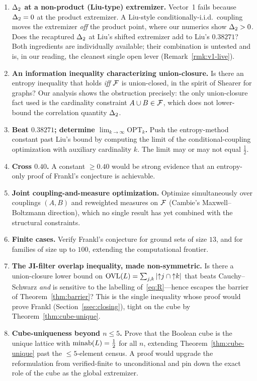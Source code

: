 \documentclass[11pt]{amsart}
\theoremstyle{definition}
\theoremstyle{remark}
\begin{document}
\begin{enumerate}[label=(Q\arabic*),leftmargin=2.6em]
\item \textbf{$\Delta_2$ at a non-product (Liu-type) extremizer.} Vector~1 fails
because $\Delta_2=0$ at the product extremizer. A Liu-style conditionally-i.i.d.\
coupling moves the extremizer \emph{off} the product point, where our numerics
show $\Delta_2>0$. Does the recaptured $\Delta_2$ at Liu's shifted extremizer add to
Liu's $0.38271$? Both ingredients are individually available; their combination is
untested and is, in our reading, the cleanest single open lever
(Remark~\ref{rmk:v1-live}).
\item \textbf{An information inequality characterizing union-closure.} Is there an
entropy inequality that holds \emph{iff} $\mathcal{F}$ is union-closed, in the spirit of
Shearer for graphs? Our analysis shows the obstruction precisely: the only
union-closure fact used is the cardinality constraint $A\cup B\in\mathcal{F}$, which does
not lower-bound the correlation quantity $\Delta_2$.
\item \textbf{Beat $0.38271$; determine $\lim_{k\to\infty}\mathrm{OPT}_k$.} Push the
entropy-method constant past Liu's bound by computing the limit of the
conditional-coupling optimization with auxiliary cardinality $k$. The limit may or
may not equal $\tfrac12$.
\item \textbf{Cross $0.40$.} A constant $\ge 0.40$ would be strong evidence that an
entropy-only proof of Frankl's conjecture is achievable.
\item \textbf{Joint coupling-and-measure optimization.} Optimize simultaneously
over couplings $(A,B)$ and reweighted measures on $\mathcal{F}$ (Cambie's
Maxwell--Boltzmann direction), which no single result has yet combined with the
structural constraints.
\item \textbf{Finite cases.} Verify Frankl's conjecture for ground sets of size
$13$, and for families of size up to $100$, extending the computational frontier.
\item \textbf{The JI-filter overlap inequality, made non-symmetric.} Is there a
union-closure lower bound on $\mathrm{OVL}(L)=\sum_{j,k}|{\uparrow}j\cap{\uparrow}k|$ that
beats Cauchy--Schwarz \emph{and} is sensitive to the labelling
of~\eqref{eq:R}---hence escapes the barrier of Theorem~\ref{thm:barrier}? This is
the single inequality whose proof would prove Frankl
(Section~\ref{ssec:closing}), tight on the cube by Theorem~\ref{thm:cube-unique}.
\item \textbf{Cube-uniqueness beyond $n\le5$.} Prove that the Boolean cube is the
unique lattice with $\operatorname{minab}(L)=\tfrac12$ for all $n$, extending
Theorem~\ref{thm:cube-unique} past the $\le 5$-element census. A proof would
upgrade the reformulation from verified-finite to unconditional and pin down the
exact role of the cube as the global extremizer.
\end{enumerate}
\end{document}
